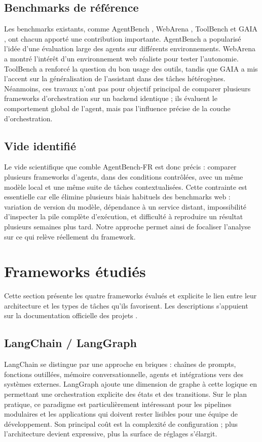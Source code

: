 \documentclass[11pt,a4paper]{article}
\begin{document}
\subsection{Benchmarks de référence}
Les benchmarks existants, comme AgentBench \cite{agentbench2023}, WebArena \cite{webarena2023}, ToolBench \cite{toolbench2023} et GAIA \cite{gaia2023}, ont chacun apporté une contribution importante. AgentBench a popularisé l'idée d'une évaluation large des agents sur différents environnements. WebArena a montré l'intérêt d'un environnement web réaliste pour tester l'autonomie. ToolBench a renforcé la question du bon usage des outils, tandis que GAIA a mis l'accent sur la généralisation de l'assistant dans des tâches hétérogènes. Néanmoins, ces travaux n'ont pas pour objectif principal de comparer plusieurs frameworks d'orchestration sur un backend identique ; ils évaluent le comportement global de l'agent, mais pas l'influence précise de la couche d'orchestration.

\subsection{Vide identifié}
Le vide scientifique que comble AgentBench-FR est donc précis : comparer plusieurs frameworks d'agents, dans des conditions contrôlées, avec un même modèle local et une même suite de tâches contextualisées. Cette contrainte est essentielle car elle élimine plusieurs biais habituels des benchmarks web : variation de version du modèle, dépendance à un service distant, impossibilité d'inspecter la pile complète d'exécution, et difficulté à reproduire un résultat plusieurs semaines plus tard. Notre approche permet ainsi de focaliser l'analyse sur ce qui relève réellement du framework.

\section{Frameworks étudiés}
\label{sec:frameworks}
Cette section présente les quatre frameworks évalués et explicite le lien entre leur architecture et les types de tâches qu'ils favorisent. Les descriptions s'appuient sur la documentation officielle des projets \cite{langchain_docs,crewai_docs,autogen_docs,llamaindex_docs,ollama_docs}.

\subsection{LangChain / LangGraph}
LangChain se distingue par une approche en briques : chaînes de prompts, fonctions outillées, mémoire conversationnelle, agents et intégrations vers des systèmes externes. LangGraph ajoute une dimension de graphe à cette logique en permettant une orchestration explicite des états et des transitions. Sur le plan pratique, ce paradigme est particulièrement intéressant pour les pipelines modulaires et les applications qui doivent rester lisibles pour une équipe de développement. Son principal coût est la complexité de configuration ; plus l'architecture devient expressive, plus la surface de réglages s'élargit.
\end{document}
